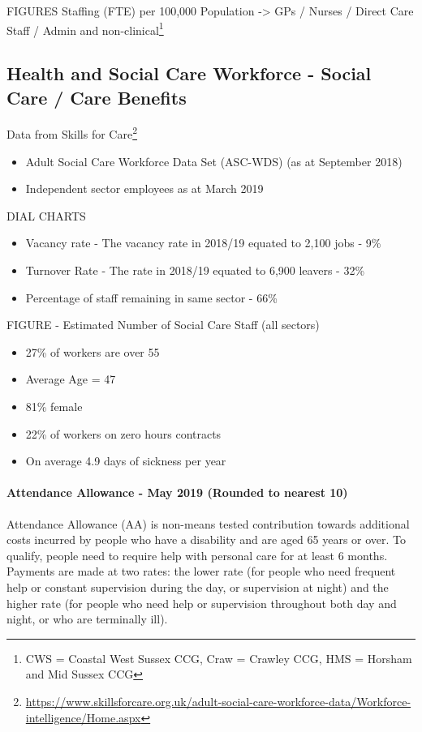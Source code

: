FIGURES Staffing (FTE) per 100,000 Population -> GPs / Nurses / Direct Care Staff / Admin and non-clinical\footnote{CWS = Coastal West Sussex CCG, Craw = Crawley CCG, HMS = Horsham and Mid Sussex CCG}

\subsection{Health and Social Care Workforce - Social Care / Care Benefits}
Data from Skills for Care\footnote{\url{https://www.skillsforcare.org.uk/adult-social-care-workforce-data/Workforce-intelligence/Home.aspx}}
\begin{itemize}[noitemsep]
    \item Adult Social Care Workforce Data Set (ASC-WDS) (as at September 2018)
    \item Independent sector employees as at March 2019
\end{itemize}

DIAL CHARTS

\begin{itemize}[noitemsep]
    \item Vacancy rate - The vacancy rate in 2018/19 equated to 2,100 jobs - 9\%
    \item Turnover Rate - The rate in 2018/19 equated to 6,900 leavers - 32\%
    \item Percentage of staff remaining in same sector - 66\%
\end{itemize} 

FIGURE - Estimated Number of Social Care Staff (all sectors)

\begin{itemize}[noitemsep]
    \item 27\% of workers are over 55
    \item Average Age = 47
    \item 81\% female
    \item 22\% of workers on zero hours contracts
    \item On average 4.9 days of sickness per year
\end{itemize}
   
\paragraph{Attendance Allowance - May 2019 (Rounded to nearest 10)} Attendance Allowance (AA) is non-means tested contribution towards additional costs incurred by people who have a disability and are aged 65 years or over. To qualify, people need to require help with personal care for at least 6 months. Payments are made at two rates: the lower rate (for people who need frequent help or constant supervision during the day, or supervision at night) and the higher rate (for people who need help or supervision throughout both day and night, or who are terminally ill).

